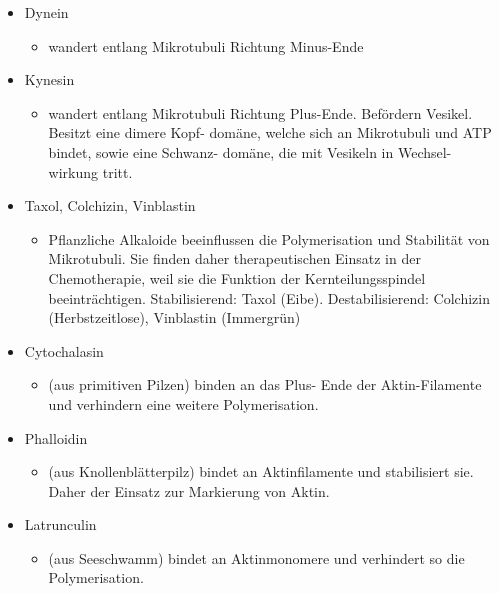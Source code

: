 \documentclass{article}
\begin{document}
\begin{itemize}
    \item Dynein
        \begin{itemize}
            \item wandert entlang Mikrotubuli Richtung Minus-Ende
        \end{itemize}
        
    \item Kynesin
        \begin{itemize}
            \item wandert entlang Mikrotubuli Richtung Plus-Ende. Befördern Vesikel. Besitzt eine dimere Kopf- domäne, welche sich an Mikrotubuli und ATP bindet, sowie eine Schwanz- domäne, die mit Vesikeln in Wechsel- wirkung tritt.
        \end{itemize}
    
    \item Taxol, Colchizin, Vinblastin    
        \begin{itemize}
            \item Pflanzliche Alkaloide beeinflussen die Polymerisation und Stabilität von Mikrotubuli. Sie finden daher therapeutischen Einsatz in der Chemotherapie, weil sie die Funktion der Kernteilungsspindel beeinträchtigen. Stabilisierend: Taxol (Eibe). Destabilisierend: Colchizin (Herbstzeitlose), Vinblastin (Immergrün)
        \end{itemize}

    \item Cytochalasin
        \begin{itemize}
            \item (aus primitiven Pilzen) binden an das Plus- Ende der Aktin-Filamente und verhindern eine weitere Polymerisation.
        \end{itemize}
        
    \item Phalloidin
        \begin{itemize}
            \item (aus Knollenblätterpilz) bindet an Aktinfilamente und stabilisiert sie. Daher der Einsatz zur Markierung von Aktin.
        \end{itemize}
        
    \item Latrunculin
        \begin{itemize}
            \item (aus Seeschwamm) bindet an Aktinmonomere und verhindert so die Polymerisation.
        \end{itemize}


\end{itemize}
\end{document}
